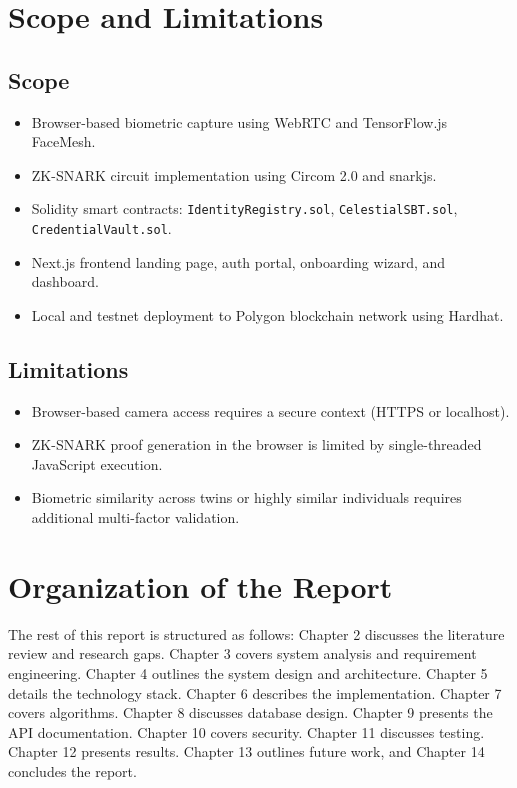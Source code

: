 \documentclass[12pt,a4paper,oneside]{report}
\begin{document}
\section{Scope and Limitations}
\subsection{Scope}
\begin{itemize}
    \item Browser-based biometric capture using WebRTC and TensorFlow.js FaceMesh.
    \item ZK-SNARK circuit implementation using Circom 2.0 and snarkjs.
    \item Solidity smart contracts: \texttt{IdentityRegistry.sol}, \texttt{CelestialSBT.sol}, \texttt{CredentialVault.sol}.
    \item Next.js frontend landing page, auth portal, onboarding wizard, and dashboard.
    \item Local and testnet deployment to Polygon blockchain network using Hardhat.
\end{itemize}

\subsection{Limitations}
\begin{itemize}
    \item Browser-based camera access requires a secure context (HTTPS or localhost).
    \item ZK-SNARK proof generation in the browser is limited by single-threaded JavaScript execution.
    \item Biometric similarity across twins or highly similar individuals requires additional multi-factor validation.
\end{itemize}

\section{Organization of the Report}
The rest of this report is structured as follows: Chapter 2 discusses the literature review and research gaps. Chapter 3 covers system analysis and requirement engineering. Chapter 4 outlines the system design and architecture. Chapter 5 details the technology stack. Chapter 6 describes the implementation. Chapter 7 covers algorithms. Chapter 8 discusses database design. Chapter 9 presents the API documentation. Chapter 10 covers security. Chapter 11 discusses testing. Chapter 12 presents results. Chapter 13 outlines future work, and Chapter 14 concludes the report.
\end{document}
